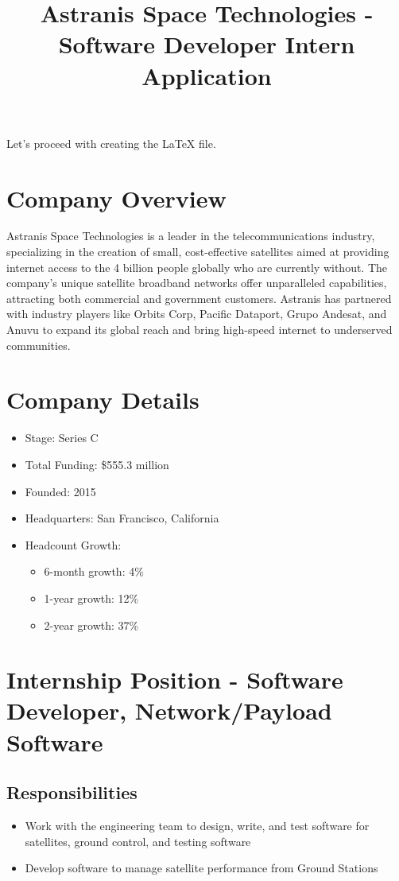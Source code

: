 Let's proceed with creating the LaTeX file.\documentclass{article}
\title{Astranis Space Technologies - Software Developer Intern Application}
\begin{document}
\maketitle

\section{Company Overview}
Astranis Space Technologies is a leader in the telecommunications industry, specializing in the creation of small, cost-effective satellites aimed at providing internet access to the 4 billion people globally who are currently without. The company's unique satellite broadband networks offer unparalleled capabilities, attracting both commercial and government customers. Astranis has partnered with industry players like Orbits Corp, Pacific Dataport, Grupo Andesat, and Anuvu to expand its global reach and bring high-speed internet to underserved communities.

\section{Company Details}
\begin{itemize}
    \item Stage: Series C
    \item Total Funding: \$555.3 million
    \item Founded: 2015
    \item Headquarters: San Francisco, California
    \item Headcount Growth: 
    \begin{itemize}
        \item 6-month growth: 4\%
        \item 1-year growth: 12\%
        \item 2-year growth: 37\%
    \end{itemize}
\end{itemize}

\section{Internship Position - Software Developer, Network/Payload Software}
\subsection{Responsibilities}
\begin{itemize}
    \item Work with the engineering team to design, write, and test software for satellites, ground control, and testing software
    \item Develop software to manage satellite performance from Ground Stations
\end{itemize}
\end{document}
